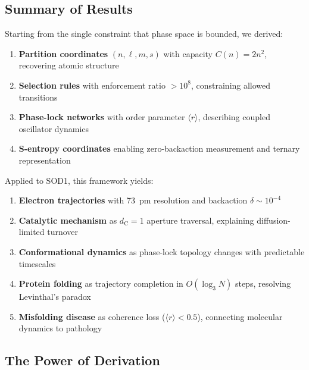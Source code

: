 \documentclass[twocolumn,aps,prx,superscriptaddress,longbibliography]{revtex4-2}
\theoremstyle{remark}
\newcommand{\dC}{d_\text{C}}
\newcommand{\orderpar}{\langle r \rangle}
\begin{document}
\subsection{Summary of Results}

Starting from the single constraint that phase space is bounded, we
derived:

\begin{enumerate}
    \item \textbf{Partition coordinates} $(n, \ell, m, s)$ with capacity
    $C(n) = 2n^2$, recovering atomic structure

    \item \textbf{Selection rules} with enforcement ratio $>10^8$,
    constraining allowed transitions

    \item \textbf{Phase-lock networks} with order parameter $\orderpar$,
    describing coupled oscillator dynamics

    \item \textbf{S-entropy coordinates} enabling zero-backaction
    measurement and ternary representation
\end{enumerate}

Applied to SOD1, this framework yields:

\begin{enumerate}
    \item \textbf{Electron trajectories} with 73~pm resolution and
    backaction $\delta \sim 10^{-4}$

    \item \textbf{Catalytic mechanism} as $\dC = 1$ aperture traversal,
    explaining diffusion-limited turnover

    \item \textbf{Conformational dynamics} as phase-lock topology changes
    with predictable timescales

    \item \textbf{Protein folding} as trajectory completion in
    $O(\log_3 N)$ steps, resolving Levinthal's paradox

    \item \textbf{Misfolding disease} as coherence loss ($\orderpar < 0.5$),
    connecting molecular dynamics to pathology
\end{enumerate}

\subsection{The Power of Derivation}
\end{document}
